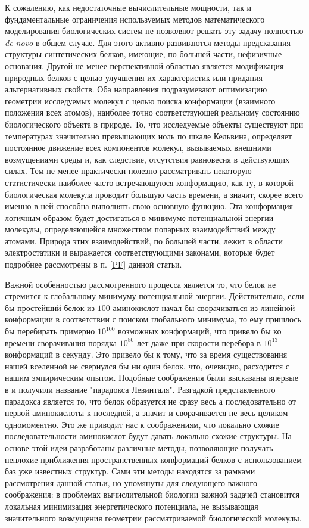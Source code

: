   К сожалению, как недостаточные вычислительные мощности, так и фундаментальные ограничения используемых методов математического моделирования биологических систем не позволяют решать эту задачу полностью \textit{de novo} в общем случае.
  Для этого активно развиваются методы предсказания структуры синтетических белков, имеющие, по большей части, нефизичные основания.
  Другой не менее перспективной областью является модификация природных белков с целью улучшения их характеристик или придания альтернативных свойств.
  Оба направления подразумевают оптимизацию геометрии исследуемых молекул с целью поиска конформации (взаимного положения всех атомов), наиболее точно соответствующей реальному состоянию биологического объекта в природе.
  То, что исследуемые объекты существуют при температурах значительно превышающих ноль по шкале Кельвина, определяет постоянное движение всех компонентов молекул, вызываемых внешними возмущениями среды и, как следствие, отсутствия равновесия в действующих силах.
  Тем не менее практически полезно рассматривать некоторую статистически наиболее часто встречающуюся конформацию, как ту, в которой биологическая молекула проводит большую часть времени, а значит, скорее всего именно в ней способна выполнять свою основную функцию.
  Эта конформация логичным образом будет достигаться в минимуме потенциальной энергии молекулы, определяющейся множеством попарных взаимодействий между атомами.
  Природа этих взаимодействий, по большей части, лежит в области электростатики и выражается соответствующими законами, которые будет подробнее рассмотрены в п. \ref{PF} данной статьи.

  Важной особенностью рассмотренного процесса является то, что белок не стремится к глобальному минимуму потенциальной энергии.
  Действительно, если бы простейший белок из $100$ аминокислот начал бы сворачиваться из линейной конформации в соответствии с поиском глобального минимума, то ему пришлось бы перебирать примерно $10^{100}$ возможных конформаций, что привело бы ко времени сворачивания порядка $10^{80}$ лет даже при скорости перебора в $10^{13}$ конформаций в секунду.
  Это привело бы к тому, что за время существования нашей вселенной не свернулся бы ни один белок, что, очевидно, расходится с нашим эмпирическим опытом.
  Подобные соображения были высказаны впервые в \cite{levinthal1969} и получили название "парадокса Левинталя".
  Разгадкой представленного парадокса является то, что белок образуется не сразу весь а последовательно от первой аминокислоты к последней, а значит и сворачивается не весь целиком одномоментно.
  Это же приводит нас к соображениям, что локально схожие последовательности аминокислот будут давать локально схожие структуры.
  На основе этой идеи разработаны различные методы, позволяющие получать неплохие приближения пространственных конформаций белков с использованием баз уже известных структур.
  Сами эти методы находятся за рамками рассмотрения данной статьи, но упомянуты для следующего важного соображения: в проблемах вычислительной биологии важной задачей становится локальная минимизация энергетического потенциала, не вызывающая значительного возмущения геометрии рассматриваемой биологической молекулы.

